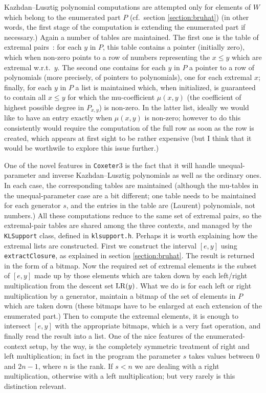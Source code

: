 \documentclass[11pt]{article}
\newcommand{\coxeter}{{\tt Coxeter}}
\newcommand{\klpol}{Kazh\-dan--Lusz\-tig po\-ly\-no\-mial}
\newcommand{\LR}{{\rm LR}}
\begin{document}
\klpol{} computations are attempted only for elements of $W$ which belong
to the enumerated part $P$ (cf.\ section \ref{section:bruhat}) (in other
words, the first stage of the computation is extending the enumerated part if
necessary.) Again a number of tables are maintained. The first one is the
table of extremal pairs~: for each $y$ in $P$, this table contains a
pointer (initially zero), which when non-zero points to a row
of numbers representing the $x\leq y$ which are extremal w.r.t.\ $y$. The
second one contains for each $y$ in $P$ a pointer to a
row of polynomials (more precisely,
of pointers to polynomials), one for each extremal $x$; finally, for each
$y$ in $P$ a list is maintained which, when initialized,
is guaranteed to contain all $x\leq y$
for which the mu-coefficient $\mu(x,y)$ (the coefficient of highest possible
degree in $P_{x,y}$) is non-zero. In the latter list, ideally we would like
to have an entry exactly when $\mu(x,y)$ is non-zero; however to do this
consistently would require the computation of the full row as soon as the
row is created, which appears at first sight to be rather expensive (but I
think that it would be worthwile to explore this issue further.)

One of the novel features in \coxeter3 is the fact that it will handle
unequal-parameter and inverse \klpol s as well as the ordinary ones. In
each case, the corresponding tables are maintained (although the mu-tables
in the unequal-parameter case are a bit different; one table needs to be
maintained for each generator $s$, and the entries in the table are
(Laurent) polynomials, not numbers.) All these computations reduce to the
same set of extremal pairs, so the extremal-pair tables are shared among
the three contexts, and managed by the {\tt KLSupport} class, defined in
{\tt klsupport.h}. Perhaps it is worth explaining how the extremal lists
are constructed. First we construct the interval $[e,y]$ using
{\tt extractClosure}, as explained in section \ref{section:bruhat}. The
result is returned in the form of a bitmap. Now the required set of extremal
elements is the subset of $[e,y]$ made up by those elements which are taken
down by each left/right multiplication from the descent set $\LR(y)$. What
we do is for each left or right multiplication by a generator, maintain a
bitmap of the set of elements in $P$ which are taken down (these bitmaps
have to be enlarged at each extension of the enumerated part.) Then to
compute the extremal elements, it is enough to intersect $[e,y]$ with the
appropriate bitmaps, which is a very fast operation, and finally read
the result into a list. One of the nice features of the enumerated-context
setup, by the way, is the completely symmetric treatment of right and
left multiplication; in fact in the program the parameter $s$ takes values
between $0$ and $2n-1$, where $n$ is the rank. If $s<n$ we are dealing
with a right multiplication, otherwise with a left multiplication; but very
rarely is this distinction relevant.
\end{document}
